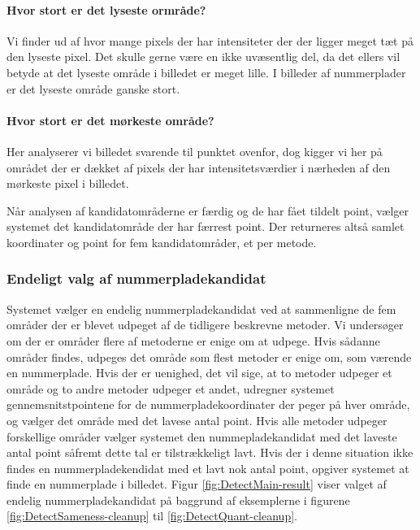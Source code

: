 \paragraph*{Hvor stort er det lyseste ormråde?}
Vi finder ud af hvor mange pixels der har intensiteter der der ligger meget tæt på den lyseste pixel. Det skulle gerne være en ikke uvæsentlig del, da det ellers vil betyde at det lyseste område i billedet er meget lille. I billeder af nummerplader er det lyseste område ganske stort. 

\paragraph*{Hvor stort er det mørkeste område?}
Her analyserer vi billedet svarende til punktet ovenfor, dog kigger vi her på området der er dækket af pixels der har intensitetsværdier i nærheden af den mørkeste pixel i billedet.

Når analysen af kandidatområderne er færdig og de har fået tildelt point, vælger systemet det kandidatområde der har færrest point. Der returneres altså samlet koordinater og point for  fem kandidatområder, et per metode.

\subsubsection{Endeligt valg af nummerpladekandidat}
Systemet vælger en endelig nummerpladekandidat ved at sammenligne de fem områder der er blevet udpeget af de tidligere beskrevne metoder. Vi undersøger om der er områder flere af metoderne er enige om at udpege. Hvis sådanne områder findes, udpeges det område som flest metoder er enige om, som værende en nummerplade. Hvis der er uenighed, det vil sige, at to metoder udpeger et område og to andre metoder udpeger et andet,  udregner systemet gennemsnitstpointene for de nummerpladekoordinater der peger på hver område, og vælger det område med det lavese antal point. Hvis alle metoder udpeger forskellige områder vælger systemet den nummepladekandidat med det laveste antal point såfremt dette tal er tilstrækkeligt lavt. Hvis der i denne situation ikke findes en nummerpladekendidat med et lavt nok antal point, opgiver systemet at finde en nummerplade i billedet. Figur \ref{fig:DetectMain-result} viser valget af endelig nummerpladekandidat på baggrund af eksemplerne i figurene \ref{fig:DetectSameness-cleanup} til \vref{fig:DetectQuant-cleanup}.

